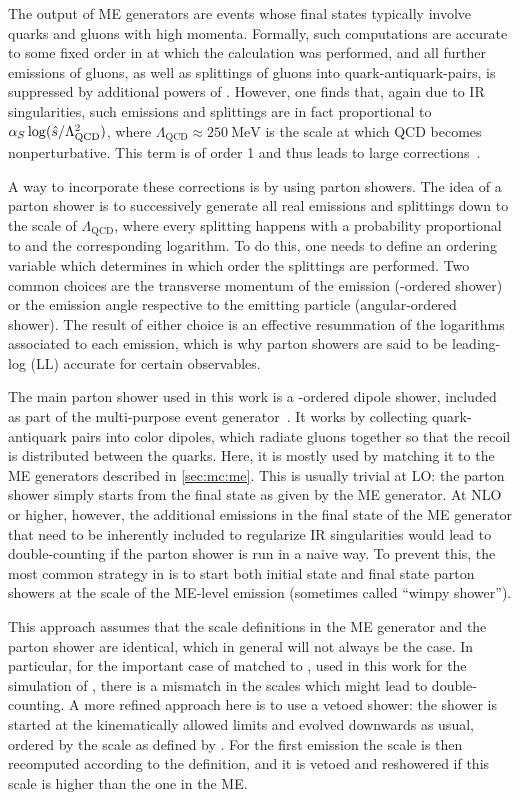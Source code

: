 The output of ME generators are events whose final states typically involve quarks and gluons with high momenta. Formally, such computations are accurate to some fixed order in \alphas at which the calculation was performed, and all further emissions of gluons, as well as splittings of gluons into quark-antiquark-pairs, is suppressed by additional powers of \alphas. However, one finds that, again due to IR singularities, such emissions and splittings are in fact proportional to $\alpha_S \log( \hat{s} / \Lambda_{\mathrm{QCD}}^2)$, where $\Lambda_{\mathrm{QCD}} \approx \SI{250}{\MeV}$ is the scale at which QCD becomes nonperturbative. This term is of order 1 and thus leads to large corrections~\cite{Peskin:1995ev,Skands:2012ts}.

A way to incorporate these corrections is by using parton showers. The idea of a parton shower is to successively generate all real emissions and splittings down to the scale of $\Lambda_{\mathrm{QCD}}$, where every splitting happens with a probability proportional to \alphas and the corresponding logarithm. To do this, one needs to define an ordering variable which determines in which order the splittings are performed. Two common choices are the transverse momentum of the emission (\pt-ordered shower) or the emission angle respective to the emitting particle (angular-ordered shower). The result of either choice is an effective resummation of the logarithms associated to each emission, which is why parton showers are said to be leading-log (LL) accurate for certain observables.

The main parton shower used in this work is a \pt-ordered dipole shower, included as part of the \pythia multi-purpose event generator~\cite{Pythia:2015,Pythia:2022}. It works by collecting quark-antiquark pairs into color dipoles, which radiate gluons together so that the recoil is distributed between the quarks. Here, it is mostly used by matching it to the ME generators described in \cref{sec:mc:me}. This is usually trivial at LO: the parton shower simply starts from the final state as given by the ME generator. At NLO or higher, however, the additional emissions in the final state of the ME generator that need to be inherently included to regularize IR singularities would lead to double-counting if the parton shower is run in a naive way. To prevent this, the most common strategy in \pythia is to start both initial state and final state parton showers at the scale of the ME-level emission (sometimes called ``wimpy shower'').

This approach assumes that the scale definitions in the ME generator and the parton shower are identical, which in general will not always be the case. In particular, for the important case of \powheg matched to \pythia, used in this work for the simulation of \pptt, there is a mismatch in the scales which might lead to double-counting. A more refined approach here is to use a vetoed shower: the shower is started at the kinematically allowed limits and evolved downwards as usual, ordered by the scale as defined by \pythia. For the first emission the scale is then recomputed according to the \powheg definition, and it is vetoed and reshowered if this scale is higher than the one in the ME.


